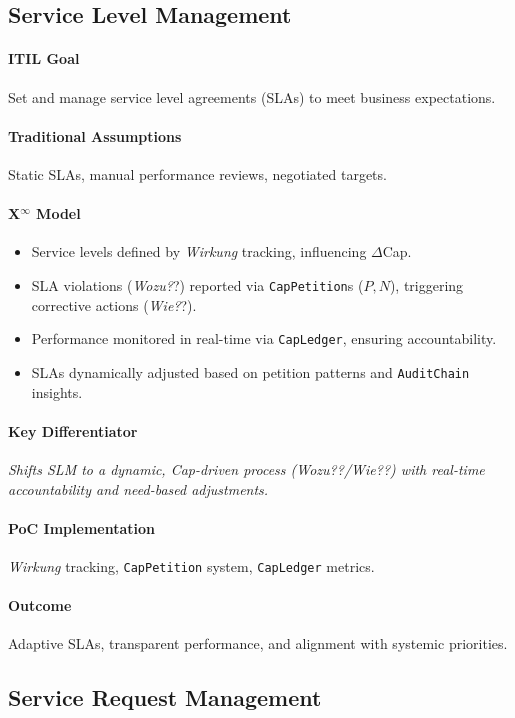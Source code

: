 \documentclass[12pt, a4paper]{scrartcl}
\newcommand{\Xinf}{X$^\infty$}                        %
\newcommand{\DeltaCap}{$\Delta$Cap}                    %
\newcommand{\CapLedger}{\texttt{CapLedger}}          %
\newcommand{\Wirkung}{\textit{Wirkung}}                 %
\newcommand{\AuditChain}{\texttt{AuditChain}}
\newcommand{\CapPetition}{\texttt{CapPetition}}        %
\newcommand{\Wozu}{\textit{Wozu?}}                      %
\newcommand{\Wie}{\textit{Wie?}}                        %
\begin{document}
\subsection{Service Level Management} %
\paragraph{ITIL Goal} Set and manage service level agreements (SLAs) to meet business expectations.
\paragraph{Traditional Assumptions} Static SLAs, manual performance reviews, negotiated targets.
\paragraph*{\Xinf{} Model}
\begin{itemize}
    \item Service levels defined by \Wirkung{} tracking, influencing \DeltaCap{}.
    \item SLA violations (\Wozu?) reported via \CapPetition{}s ($P, N$), triggering corrective actions (\Wie?).
    \item Performance monitored in real-time via \CapLedger{}, ensuring accountability.
    \item SLAs dynamically adjusted based on petition patterns and \AuditChain{} insights.
\end{itemize}
\paragraph{Key Differentiator} \textit{Shifts SLM to a dynamic, Cap-driven process (\Wozu?/\Wie?) with real-time accountability and need-based adjustments.}
\paragraph{PoC Implementation} \Wirkung{} tracking, \CapPetition{} system, \CapLedger{} metrics.
\paragraph{Outcome} Adaptive SLAs, transparent performance, and alignment with systemic priorities.

\subsection{Service Request Management} %
\end{document}

